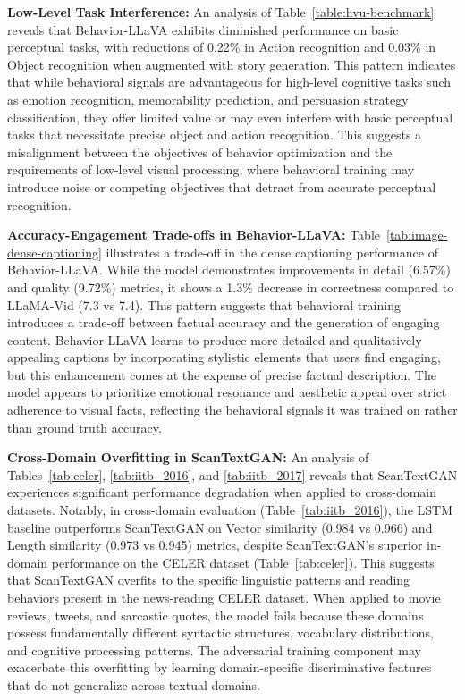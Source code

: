 \textbf{Low-Level Task Interference:}
An analysis of Table~\ref{table:hvu-benchmark} reveals that Behavior-LLaVA exhibits diminished performance on basic perceptual tasks, with reductions of 0.22\% in Action recognition and 0.03\% in Object recognition when augmented with story generation. This pattern indicates that while behavioral signals are advantageous for high-level cognitive tasks such as emotion recognition, memorability prediction, and persuasion strategy classification, they offer limited value or may even interfere with basic perceptual tasks that necessitate precise object and action recognition. This suggests a misalignment between the objectives of behavior optimization and the requirements of low-level visual processing, where behavioral training may introduce noise or competing objectives that detract from accurate perceptual recognition.

\textbf{Accuracy-Engagement Trade-offs in Behavior-LLaVA:}
Table~\ref{tab:image-dense-captioning} illustrates a trade-off in the dense captioning performance of Behavior-LLaVA. While the model demonstrates improvements in detail (6.57\%) and quality (9.72\%) metrics, it shows a 1.3\% decrease in correctness compared to LLaMA-Vid (7.3 vs 7.4). This pattern suggests that behavioral training introduces a trade-off between factual accuracy and the generation of engaging content. Behavior-LLaVA learns to produce more detailed and qualitatively appealing captions by incorporating stylistic elements that users find engaging, but this enhancement comes at the expense of precise factual description. The model appears to prioritize emotional resonance and aesthetic appeal over strict adherence to visual facts, reflecting the behavioral signals it was trained on rather than ground truth accuracy.

\textbf{Cross-Domain Overfitting in ScanTextGAN:}
An analysis of Tables~\ref{tab:celer}, \ref{tab:iitb_2016}, and \ref{tab:iitb_2017} reveals that ScanTextGAN experiences significant performance degradation when applied to cross-domain datasets. Notably, in cross-domain evaluation (Table~\ref{tab:iitb_2016}), the LSTM baseline outperforms ScanTextGAN on Vector similarity (0.984 vs 0.966) and Length similarity (0.973 vs 0.945) metrics, despite ScanTextGAN's superior in-domain performance on the CELER dataset (Table~\ref{tab:celer}). This suggests that ScanTextGAN overfits to the specific linguistic patterns and reading behaviors present in the news-reading CELER dataset. When applied to movie reviews, tweets, and sarcastic quotes, the model fails because these domains possess fundamentally different syntactic structures, vocabulary distributions, and cognitive processing patterns. The adversarial training component may exacerbate this overfitting by learning domain-specific discriminative features that do not generalize across textual domains.

